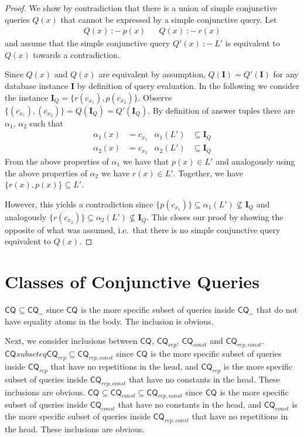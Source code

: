 \documentclass[a4paper,12pt]{article}
\newcommand{\cq}[1]{\ensuremath{\mathsf{CQ}_{#1}}}
\newcommand{\query}[3]{\ensuremath{{#1}({#2})\:{:}{-}\:{#3}}}
\begin{document}
\begin{proof}
We show by contradiction that there is a union of simple conjunctive queries $Q(x)$ that cannot be expressed by a simple conjunctive query. Let
\begin{align*}
\query{Q}{x}{p(x)} && \query{Q}{x}{r(x)}
\end{align*}
and assume that the simple conjunctive query $\query{Q'}{x}{L'}$ is equivalent to $Q(x)$ towards a contradiction.

Since $Q(x)$ and $Q(x)$ are equivalent by assumption, $Q(\textbf{I}) = Q'(\textbf{I})$ for any database instance $\textbf{I}$ by definition of query evaluation. In the following we consider the instance $\textbf{I}_Q = \{ r(c_{x_1}), p(c_{x_2}) \}$. Observe $\{ (c_{x_1}), (c_{x_2}) \} = Q(\textbf{I}_Q) = Q'(\textbf{I}_Q)$. By definition of answer tuples there are $\alpha_1$, $\alpha_2$ such that
\begin{align*}
\alpha_1(x) &= c_{x_1} &
\alpha_1(L') &\subseteq \textbf{I}_Q \\
\alpha_2(x) &= c_{x_2} &
\alpha_2(L') &\subseteq \textbf{I}_Q
\end{align*}
From the above properties of $\alpha_1$ we have that $p(x) \in L'$ and analogously using the above properties of $\alpha_2$ we have $r(x) \in L'$. Together, we have $\{ r(x), p(x) \} \subseteq L'$.

However, this yields a contradiction since $\{p(c_{x_1})\} \subseteq \alpha_1(L') \not \subseteq \textbf{I}_Q$ and analogously $\{r(c_{x_2})\} \subseteq \alpha_2(L') \not \subseteq \textbf{I}_Q$. This closes our proof by showing the opposite of what was assumed, i.e.\ that there is no simple conjunctive query equivalent to $Q(x)$.
\end{proof}

\section{Classes of Conjunctive Queries}

$\cq{} \subseteq \cq{=}$ since \cq{} is the more specific subset of queries inside \cq{=} that do not have equality atoms in the body. The inclusion is obvious.

Next, we consider inclusions between \cq{}, \cq{rep}, \cq{const} and \cq{rep,const}.
$\cq{} subseteq \cq{rep} \subseteq \cq{rep,const}$ since \cq{} is the more specific subset of queries inside \cq{rep} that have no repetitions in the head, and \cq{rep} is the more specific subset of queries inside \cq{rep,const} that have no constants in the head. These inclusions are obvious.
$\cq{} \subseteq \cq{const} \subseteq \cq{rep,const}$ since \cq{} is the more specific subset of queries inside \cq{const} that have no constants in the head, and \cq{const} is the more specific subset of queries inside \cq{rep,const} that have no repetitions in the head. These inclusions are obvious.
\end{document}
